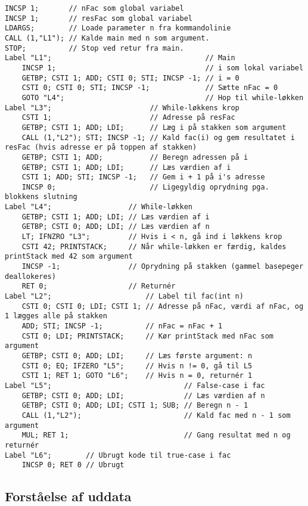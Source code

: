 \begin{verbatim}
INCSP 1;       // nFac som global variabel
INCSP 1;       // resFac som global variabel
LDARGS;        // Loade parameter n fra kommandolinie
CALL (1,"L1"); // Kalde main med n som argument.
STOP;          // Stop ved retur fra main.
Label "L1";                                    // Main
    INCSP 1;                                   // i som lokal variabel
    GETBP; CSTI 1; ADD; CSTI 0; STI; INCSP -1; // i = 0
    CSTI 0; CSTI 0; STI; INCSP -1;             // Sætte nFac = 0
    GOTO "L4";                                 // Hop til while-løkken
Label "L3";                       // While-løkkens krop
    CSTI 1;                       // Adresse på resFac
    GETBP; CSTI 1; ADD; LDI;      // Læg i på stakken som argument
    CALL (1,"L2"); STI; INCSP -1; // Kald fac(i) og gem resultatet i resFac (hvis adresse er på toppen af stakken)
    GETBP; CSTI 1; ADD;           // Beregn adressen på i
    GETBP; CSTI 1; ADD; LDI;      // Læs værdien af i
    CSTI 1; ADD; STI; INCSP -1;   // Gem i + 1 på i's adresse
    INCSP 0;                      // Ligegyldig oprydning pga. blokkens slutning
Label "L4";                  // While-løkken
    GETBP; CSTI 1; ADD; LDI; // Læs værdien af i
    GETBP; CSTI 0; ADD; LDI; // Læs værdien af n
    LT; IFNZRO "L3";         // Hvis i < n, gå ind i løkkens krop
    CSTI 42; PRINTSTACK;     // Når while-løkken er færdig, kaldes printStack med 42 som argument
    INCSP -1;                // Oprydning på stakken (gammel basepeger deallokeres)
    RET 0;                   // Returnér
Label "L2";                      // Label til fac(int n)
    CSTI 0; CSTI 0; LDI; CSTI 1; // Adresse på nFac, værdi af nFac, og 1 lægges alle på stakken
    ADD; STI; INCSP -1;          // nFac = nFac + 1
    CSTI 0; LDI; PRINTSTACK;     // Kør printStack med nFac som argument
    GETBP; CSTI 0; ADD; LDI;     // Læs første argument: n
    CSTI 0; EQ; IFZERO "L5";     // Hvis n != 0, gå til L5
    CSTI 1; RET 1; GOTO "L6";    // Hvis n = 0, returnér 1
Label "L5";                               // False-case i fac
    GETBP; CSTI 0; ADD; LDI;              // Læs værdien af n
    GETBP; CSTI 0; ADD; LDI; CSTI 1; SUB; // Beregn n - 1
    CALL (1,"L2");                        // Kald fac med n - 1 som argument
    MUL; RET 1;                           // Gang resultat med n og returnér
Label "L6";        // Ubrugt kode til true-case i fac
    INCSP 0; RET 0 // Ubrugt
\end{verbatim}

\subsection{Forståelse af uddata}

